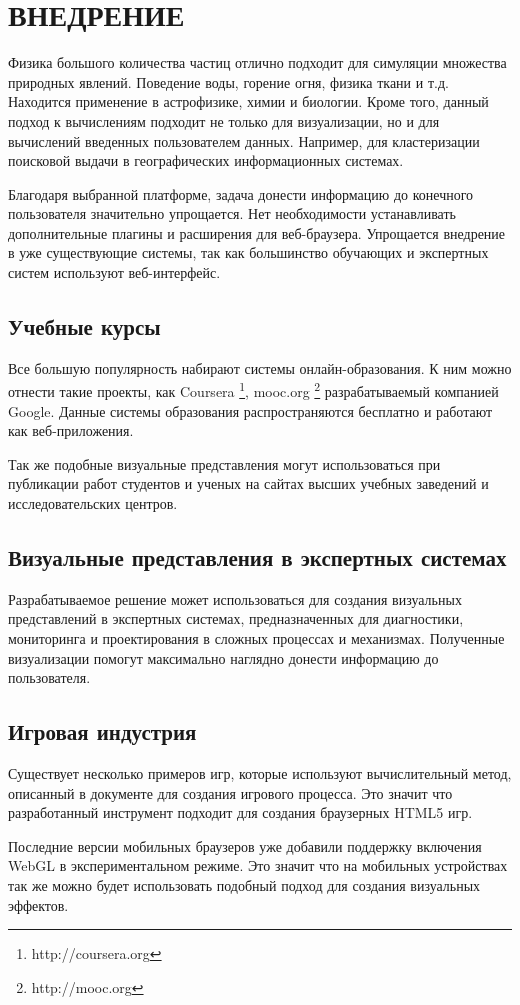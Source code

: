 \newpage

\section{ВНЕДРЕНИЕ} %

Физика большого количества частиц отлично подходит для симуляции множества
природных явлений. Поведение воды, горение огня, физика ткани и т.д.
Находится применение в астрофизике, химии и биологии. Кроме того,
данный подход к вычислениям подходит не только для визуализации, но 
и для вычислений введенных пользователем данных. Например, для кластеризации 
поисковой выдачи в географических информационных системах.

Благодаря выбранной платформе, задача донести информацию до конечного пользователя
значительно упрощается. Нет необходимости устанавливать дополнительные плагины
и расширения для веб-браузера. Упрощается внедрение в уже существующие системы, 
так как большинство обучающих и экспертных систем используют веб-интерфейс.

\subsection{Учебные курсы}

Все большую популярность набирают системы онлайн-образования. К ним можно
отнести такие проекты, как Coursera \footnote{http://coursera.org}, mooc.org \footnote{http://mooc.org}
разрабатываемый компанией Google. Данные системы образования распространяются бесплатно 
и работают как веб-приложения.

Так же подобные визуальные представления могут использоваться при публикации работ студентов 
и ученых на сайтах высших учебных заведений и исследовательских центров.

\subsection{Визуальные представления в экспертных системах}

Разрабатываемое решение может использоваться для создания визуальных представлений
в экспертных системах, предназначенных для диагностики, мониторинга и проектирования
в сложных процессах и механизмах. Полученные визуализации помогут максимально наглядно
донести информацию до пользователя.

\subsection{Игровая индустрия}

Существует несколько примеров игр, которые используют вычислительный метод, описанный 
в документе для создания игрового процесса. Это значит что разработанный инструмент
подходит для создания браузерных HTML5 игр.

Последние версии мобильных браузеров уже добавили поддержку включения WebGL в
экспериментальном режиме. Это значит что на мобильных устройствах так же можно будет
использовать подобный подход для создания визуальных эффектов.
